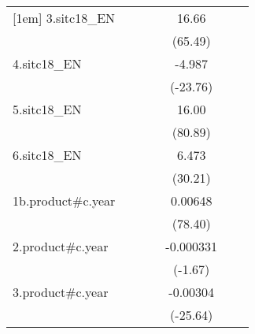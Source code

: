 {\begin{tabular}{l*{6}{c}}
[1em]
3.sitc18\_EN         &                     &                     &                     &       16.66\sym{***}&                     &                     \\
                    &                     &                     &                     &     (65.49)         &                     &                     \\
[1em]
4.sitc18\_EN         &                     &                     &                     &      -4.987\sym{***}&                     &                     \\
                    &                     &                     &                     &    (-23.76)         &                     &                     \\
[1em]
5.sitc18\_EN         &                     &                     &                     &       16.00\sym{***}&                     &                     \\
                    &                     &                     &                     &     (80.89)         &                     &                     \\
[1em]
6.sitc18\_EN         &                     &                     &                     &       6.473\sym{***}&                     &                     \\
                    &                     &                     &                     &     (30.21)         &                     &                     \\
[1em]
1b.product#c.year   &                     &                     &                     &     0.00648\sym{***}&                     &                     \\
                    &                     &                     &                     &     (78.40)         &                     &                     \\
[1em]
2.product#c.year    &                     &                     &                     &   -0.000331         &                     &                     \\
                    &                     &                     &                     &     (-1.67)         &                     &                     \\
[1em]
3.product#c.year    &                     &                     &                     &    -0.00304\sym{***}&                     &                     \\
                    &                     &                     &                     &    (-25.64)         &                     &                     \\

\end{tabular}}
